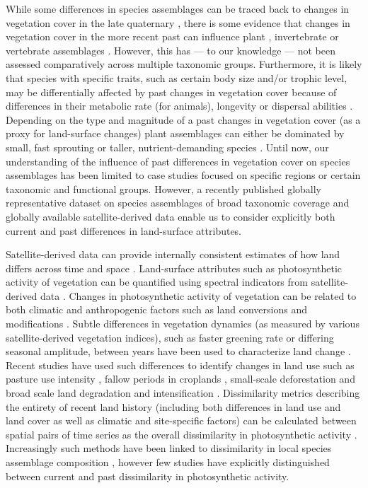 While some differences in species assemblages can be traced back to changes in vegetation cover in the late quaternary \citep{Vegas-Vilarrubia2011,McMichael2017}, there is some evidence that changes in vegetation cover in the more recent past can influence plant \citep{Jakovac2016}, invertebrate \citep{Valtonen2013} or vertebrate assemblages \citep{Newton2014, Cole2015, Graham2015}. However, this has — to our knowledge — not been assessed comparatively across multiple taxonomic groups. Furthermore, it is likely that species with specific traits, such as certain body size and/or trophic level, may be differentially affected by past changes in vegetation cover because of differences in their metabolic rate (for animals), longevity or dispersal abilities \citep{Sutherland2000, Brown2004, Speakman2005,Thomson2011,DePalma2015}. Depending on the type and magnitude of a past changes in vegetation cover (as a proxy for land-surface changes) plant assemblages can either be dominated by small, fast sprouting or taller, nutrient-demanding species \citep{Jakovac2016,Perring2018}. Until now, our understanding of the influence of past differences in vegetation cover on species assemblages has been limited to case studies focused on specific regions or certain taxonomic and functional groups. However, a recently published globally representative dataset on species assemblages of broad taxonomic coverage \citep{Hudson2016} and globally available satellite-derived data enable us to consider explicitly both current and past differences in land-surface attributes.

Satellite-derived data can provide internally consistent estimates of how land differs across time and space \citep{Pettorelli2005, Kennedy2014}. Land-surface attributes such as photosynthetic activity of vegetation can be quantified using spectral indicators from satellite-derived data \citep{Gamon1995, Zhang2006}. Changes in photosynthetic activity of vegetation can be related to both climatic \citep{Fensholt2012, Zhu2016} and anthropogenic factors such as land conversions and modifications \citep{Lambin2003, Muller2014}. Subtle differences in vegetation dynamics (as measured by various satellite-derived vegetation indices), such as faster greening rate or differing seasonal amplitude, between years have been used to characterize land change \citep{Lambin1994, Linderman2005, Lupo2007}. Recent studies have used such differences to identify changes in land use such as pasture use intensity \citep{Rufin2015}, fallow periods in croplands \citep{Estel2015, Tong2017}, small-scale deforestation \citep{DeVries2015b} and broad scale land degradation and intensification \citep{deJong2011,Muller2014}. Dissimilarity metrics describing the entirety of recent land history (\eg including both differences in land use and land cover as well as climatic and site-specific factors) can be calculated between spatial pairs of time series as the overall dissimilarity in photosynthetic activity \citep{Linderman2005, Lhermitte2011}. Increasingly such methods have been linked to dissimilarity in local species assemblage composition \citep{Rowhani2008, Goetz2014, Nieto2015, Hobi2017}, however few studies have explicitly distinguished between current and past dissimilarity in photosynthetic activity.
	
